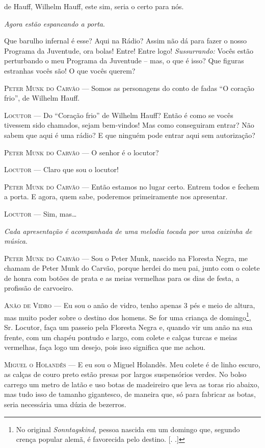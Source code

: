 \begin{myparindent}{0pt}
\begin{Parskip}
 de Hauff, Wilhelm Hauff, este sim, seria o certo para nós.

\emph{Agora estão espancando a porta}.

Que barulho infernal é esse? Aqui na Rádio? Assim não dá para fazer o
nosso Programa da Juventude, ora bolas! Entre! Entre logo!
\emph{Sussurrando:} Vocês estão perturbando o meu Programa da Juventude
-- mas, o que é isso? Que figuras estranhas vocês são! O que vocês
querem?

\textsc{Peter Munk do Carvão} --- Somos as personagens do conto de fadas ``O
coração frio'', de Wilhelm Hauff.

\textsc{Locutor} --- Do ``Coração frio'' de Wilhelm Hauff? Então é como se vocês
tivessem sido chamados, sejam bem-vindos! Mas como conseguiram entrar?
Não sabem que aqui é uma rádio? E que ninguém pode entrar aqui sem
autorização?

\textsc{Peter Munk do Carvão} --- O senhor é o locutor?

\textsc{Locutor} --- Claro que sou o locutor!

\textsc{Peter Munk do Carvão} --- Então estamos no lugar certo. Entrem todos e
fechem a porta. E agora, quem sabe, poderemos primeiramente nos
apresentar.

\textsc{Locutor} --- Sim, mas\ldots{}

\emph{Cada apresentação é acompanhada de uma melodia tocada por uma
caixinha de música}.

\textsc{Peter Munk do Carvão} --- Sou o Peter Munk, nascido na Floresta Negra, me
chamam de Peter Munk do Carvão, porque herdei do meu pai, junto com o
colete de honra com botões de prata e as meias vermelhas para os dias de
festa, a profissão de carvoeiro.

\textsc{Anão de Vidro} --- Eu sou o anão de vidro, tenho apenas 3 pés e meio de
altura, mas muito poder sobre o destino dos homens. Se for uma criança
de domingo\footnote{No original \emph{Sonntagskind,} pessoa nascida em
  um domingo que, segundo crença popular alemã, é favorecida pelo
  destino. [. .]}, Sr. Locutor, faça um passeio pela Floresta
Negra e, quando vir um anão na sua frente, com um chapéu pontudo e
largo, com colete e calças turcas e meias vermelhas, faça logo um
desejo, pois isso significa que me achou.

\textsc{Miguel o Holandês} --- E eu sou o Miguel Holandês. Meu colete é de linho
escuro, as calças de couro preto estão presas por largos suspensórios
verdes. No bolso carrego um metro de latão e uso botas de madeireiro que
leva as toras rio abaixo, mas tudo isso de tamanho gigantesco, de
maneira que, só para fabricar as botas, seria necessária uma dúzia de
bezerros.


\end{Parskip}
\end{myparindent}
